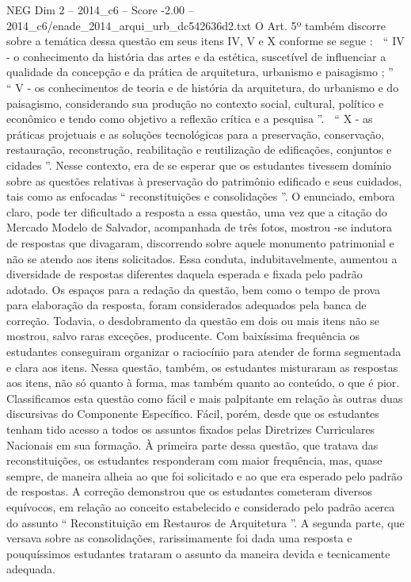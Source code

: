 \begin{textsample}{NEG Dim 2 – 2014\_c6 – Score -2.00 – 2014\_c6/enade\_2014\_arqui\_urb\_dc542636d2.txt}
O Art. 5º também discorre sobre a temática dessa questão em seus itens IV, V e X conforme se segue :  “ IV - o conhecimento da história das artes e da estética, suscetível de influenciar a qualidade da concepção e da prática de arquitetura, urbanismo e paisagismo ; ”  “ V - os conhecimentos de teoria e de história da arquitetura, do urbanismo e do paisagismo, considerando sua produção no contexto social, cultural, político e econômico e tendo como objetivo a reflexão crítica e a pesquisa ”.  “ X - as práticas projetuais e as soluções tecnológicas para a preservação, conservação, restauração, reconstrução, reabilitação e reutilização de edificações, conjuntos e cidades ”.
Nesse contexto, era de se esperar que os estudantes tivessem domínio sobre as questões relativas à preservação do patrimônio edificado e seus cuidados, tais como as enfocadas “ reconstituições e consolidações ”.
O enunciado, embora claro, pode ter dificultado a resposta a essa questão, uma vez que a citação do Mercado Modelo de Salvador, acompanhada de três fotos, mostrou -se indutora de respostas que divagaram, discorrendo sobre aquele monumento patrimonial e não se atendo aos itens solicitados.
Essa conduta, indubitavelmente, aumentou a diversidade de respostas diferentes daquela esperada e fixada pelo padrão adotado.
Os espaços para a redação da questão, bem como o tempo de prova para elaboração da resposta, foram considerados adequados pela banca de correção.
Todavia, o desdobramento da questão em dois ou mais itens não se mostrou, salvo raras exceções, producente.
Com baixíssima frequência os estudantes conseguiram organizar o raciocínio para atender de forma segmentada e clara aos itens.
Nessa questão, também, os estudantes misturaram as respostas aos itens, não só quanto à forma, mas também quanto ao conteúdo, o que é pior.
Classificamos esta questão como fácil e mais palpitante em relação às outras duas discursivas do Componente Específico.
Fácil, porém, desde que os estudantes tenham tido acesso a todos os assuntos fixados pelas Diretrizes Curriculares Nacionais em sua formação.
À primeira parte dessa questão, que tratava das reconstituições, os estudantes responderam com maior frequência, mas, quase sempre, de maneira alheia ao que foi solicitado e ao que era esperado pelo padrão de respostas.
A correção demonstrou que os estudantes cometeram diversos equívocos, em relação ao conceito estabelecido e considerado pelo padrão acerca do assunto “ Reconstituição em Restauros de Arquitetura ”.
A segunda parte, que versava sobre as consolidações, rarissimamente foi dada uma resposta e pouquíssimos estudantes trataram o assunto da maneira devida e tecnicamente adequada.

\end{textsample}
